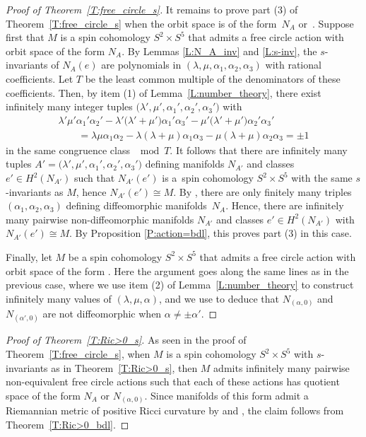 \documentclass[pdftex]{sigma}
\numberwithin{equation}{section}
\theoremstyle{definition}
\numberwithin{table}{section}
\begin{document}
\begin{proof}[Proof of Theorem~\ref{T:free_circle_s}]
	It remains to prove part (3) of Theorem~\ref{T:free_circle_s} when the orbit space is of the form~$N_A$ or~. Suppose first that $M$ is a spin cohomology $S^2\times S^5$ that admits a free circle action with orbit space of the form $N_A$. By Lemmas \ref{L:N_A_inv} and \ref{L:s-inv}, the $s$-invariants of $N_A(e)$ are polynomials in $(\lambda,\mu,\alpha_1,\alpha_2,\alpha_3)$ with rational coefficients. Let $T$ be the least common multiple of the denominators of these coefficients. Then, by item (1) of Lemma~\ref{L:number_theory}, there exist infinitely many integer tuples $\bigl(\lambda',\mu',\alpha_1',\alpha_2',\alpha_3'\bigr)$ with
	\begin{gather*} \lambda'\mu'\alpha_1'\alpha_2'-\lambda'\bigl(\lambda'+\mu'\bigr)\alpha_1'\alpha_3'-\mu'\bigl(\lambda'+\mu'\bigr)\alpha_2'\alpha_3'\\
     \qquad=\lambda\mu\alpha_1\alpha_2-\lambda(\lambda+\mu)\alpha_1\alpha_3-\mu(\lambda+\mu)\alpha_2\alpha_3=\pm 1
    \end{gather*}
	in the same congruence class $\mod T$. It follows that there are infinitely many tuples $A'=\bigl(\lambda',\mu',\alpha_1',\alpha_2',\alpha_3'\bigr)$ defining manifolds $N_{A'}$ and classes $e'\in H^2(N_{A'})$ such that $N_{A'}(e')$ is a~spin cohomology $S^2\times S^5$ with the same $s$-invariants as $M$, hence $N_{A'}(e')\cong M$. By \cite[Proposition~4.12]{Re24b}, there are only finitely many triples $(\alpha_1,\alpha_2,\alpha_3)$ defining diffeomorphic manifolds~$N_A$. Hence, there are infinitely many pairwise non-diffeomorphic manifolds $N_{A'}$ and classes $e'\in H^2(N_{A'})$ with $N_{A'}(e')\cong M$. By Proposition \ref{P:action=bdl}, this proves part (3) in this case.
	
	Finally, let $M$ be a spin cohomology $S^2\times S^5$ that admits a free circle action with orbit space of the form . Here the argument goes along the same lines as in the previous case, where we use item (2) of Lemma~\ref{L:number_theory} to construct infinitely many values of $(\lambda,\mu,\alpha)$, and we use \cite[Proposition~4.12]{Re24b} to deduce that $N_{(\alpha,0)}$ and $N_{(\alpha',0)}$ are not diffeomorphic when $\alpha\neq\pm\alpha'$.
\end{proof}

\begin{proof}[Proof of Theorem~\ref{T:Ric>0_s}]
	As seen in the proof of Theorem~\ref{T:free_circle_s}, when $M$ is a spin cohomology $S^2\times S^5$ with $s$-invariants as in Theorem~\ref{T:Ric>0_s}, then $M$ admits infinitely many pairwise non-equivalent free circle actions such that each of these actions has quotient space of the form $N_A$ or $N_{(\alpha,0)}$. Since manifolds of this form admit a Riemannian metric of positive Ricci curvature by \cite[Theorem B]{Re23} and \cite[Theorem 2.7.3]{GW09}, the claim follows from Theorem~\ref{T:Ric>0_bdl}.
\end{proof}
\end{document}
